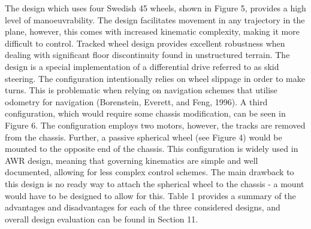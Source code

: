 \documentclass[a4paper]{article}
\begin{document}
The design which uses four Swedish 45 wheels, shown in Figure 5, provides a high level of manoeuvrability. The design facilitates movement in any trajectory in the plane, however, this comes with increased kinematic complexity, making it more difficult to control. Tracked wheel design provides excellent robustness when dealing with significant floor discontinuity found in unstructured terrain. The design is a special implementation of a differential drive referred to as skid steering. The configuration intentionally relies on wheel slippage in order to make turns. This is problematic when relying on navigation schemes that utilise odometry for navigation (Borenstein, Everett, and Feng, 1996). A third configuration, which would require some chassis modification, can be seen in Figure 6. The configuration employs two motors, however, the tracks are removed from the chassis. Further, a passive spherical wheel (see Figure 4) would be mounted to the opposite end of the chassis. This configuration is widely used in AWR design, meaning that governing kinematics are simple and well documented, allowing for less complex control schemes. The main drawback to this design is no ready way to attach the spherical wheel to the chassis - a mount would have to be designed to allow for this. Table 1 provides a summary of the advantages and disadvantages for each of the three considered designs, and overall design evaluation can be found in Section 11.
\end{document}
